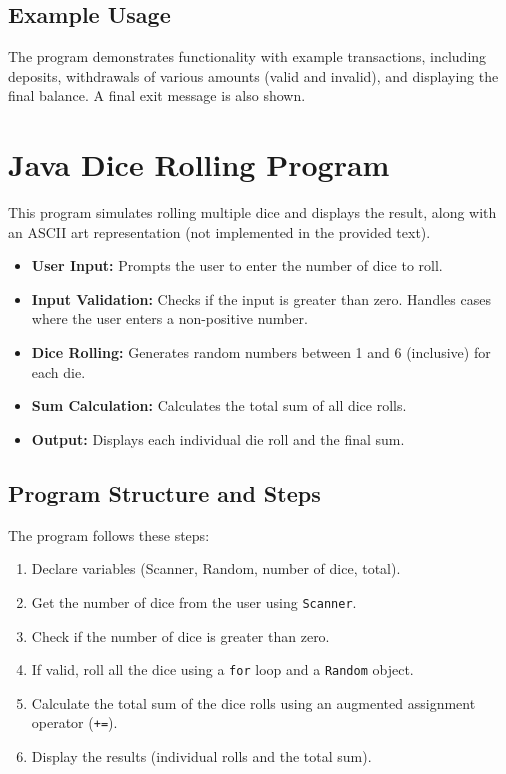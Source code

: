 \documentclass{article}
\begin{document}
\subsection{Example Usage}

The program demonstrates functionality with example transactions, including deposits, withdrawals of various amounts (valid and invalid), and displaying the final balance.  A final exit message is also shown.


\section{Java Dice Rolling Program}

This program simulates rolling multiple dice and displays the result, along with an ASCII art representation (not implemented in the provided text).

\begin{itemize}
    \item \textbf{User Input:} Prompts the user to enter the number of dice to roll.
    \item \textbf{Input Validation:} Checks if the input is greater than zero.  Handles cases where the user enters a non-positive number.
    \item \textbf{Dice Rolling:} Generates random numbers between 1 and 6 (inclusive) for each die.
    \item \textbf{Sum Calculation:} Calculates the total sum of all dice rolls.
    \item \textbf{Output:} Displays each individual die roll and the final sum.
\end{itemize}


\subsection{Program Structure and Steps}

The program follows these steps:

\begin{enumerate}
    \item Declare variables (Scanner, Random, number of dice, total).
    \item Get the number of dice from the user using \texttt{Scanner}.
    \item Check if the number of dice is greater than zero.
    \item If valid, roll all the dice using a \texttt{for} loop and a \texttt{Random} object.
    \item Calculate the total sum of the dice rolls using an augmented assignment operator (\texttt{+=}).
    \item Display the results (individual rolls and the total sum).
\end{enumerate}
\end{document}
